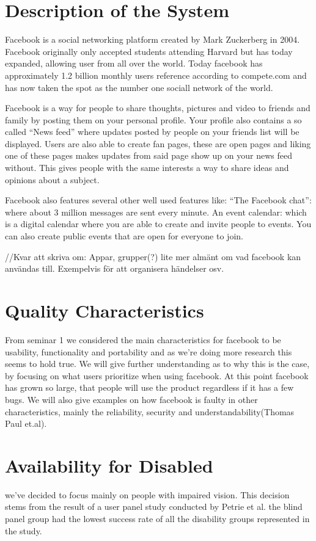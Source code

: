 \documentclass[conference]{IEEEtran}
\begin{document}
\section{Description of the System}
\label{system}

Facebook is a social networking platform created by Mark Zuckerberg in 2004.
Facebook originally only accepted students attending Harvard but has today
expanded, allowing user from all over the world. Today facebook has
approximately 1.2 billion monthly users reference according to compete.com and
has now taken the spot as the number one sociall network of the world.

Facebook is a way for people to share thoughts, pictures and video to friends
and family by posting them on your personal profile. Your profile also contains
a so called “News feed” where updates posted by people on your friends list
will be displayed. Users are also able to create fan pages, these are open
pages and liking one of these pages makes updates from said page show up on
your news feed without. This gives people with the same interests a way to
share ideas and opinions about a subject.


Facebook also features several other well used features like:
“The Facebook chat”: where about  3 million messages are sent every minute.
An event calendar: which is a digital calendar where you are able to create and
invite people to events. You can also create public events that are open for
everyone to join.

//Kvar att skriva om: Appar, grupper(?) lite mer almänt om vad facebook kan
användas till. Exempelvis för att organisera händelser osv.  


\section{Quality Characteristics}
\label{quality}
From seminar 1 we considered the main characteristics for facebook to be
usability, functionality and portability and as we’re doing more research this
seems to hold true. We will give further understanding as to why this is the
case, by focusing on what users prioritize when using facebook. At this point
facebook has grown so large, that people will use the product regardless if it
has a few bugs. We will also give examples on how facebook is faulty in other
characteristics, mainly the reliability, security and understandability(Thomas
Paul et.al).


\section{Availability for Disabled}
\label{availability}
we’ve decided to focus mainly on people with impaired vision. This decision
stems from the result of a user panel study conducted by Petrie et al. the
blind panel group had the lowest success rate of all the disability groups
represented in the study.  
\end{document}
